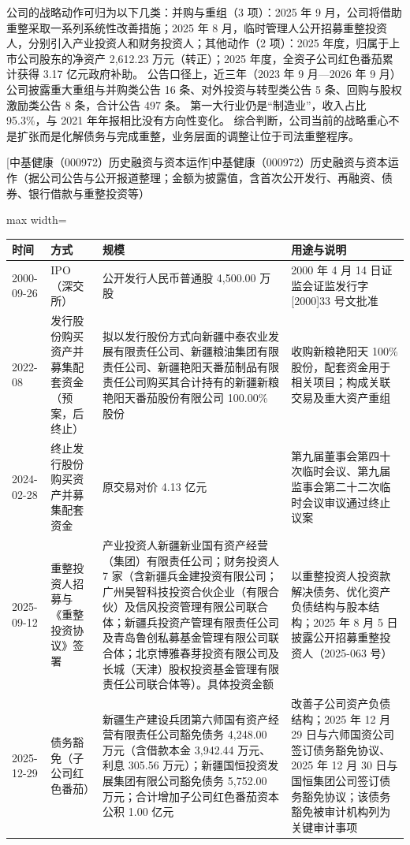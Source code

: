  公司的战略动作可归为以下几类：并购与重组（3 项）：2025 年 9 月，公司将借助重整采取一系列系统性改善措施；2025 年 8 月，临时管理人公开招募重整投资人，分别引入产业投资人和财务投资人；其他动作（2 项）：2025 年度，归属于上市公司股东的净资产 2,612.23 万元（转正）；2025 年度，全资子公司红色番茄累计获得 3.17 亿元政府补助。 公告口径上，近三年（2023 年 9 月---2026 年 9 月）公司披露重大重组与并购类公告 16 条、对外投资与转型类公告 5 条、回购与股权激励类公告 8 条，合计公告 497 条。 第一大行业仍是“制造业”，收入占比 95.3\%，与 2021 年年报相比没有方向性变化。 综合判断，公司当前的战略重心不是扩张而是化解债务与完成重整，业务层面的调整让位于司法重整程序。

\begin{center}\small\setlength{\tabcolsep}{4pt}
[中基健康（000972）历史融资与资本运作]{中基健康（000972）历史融资与资本运作（据公司公告与公开报道整理；金额为披露值，含首次公开发行、再融资、债券、银行借款与重整投资等）}
\begin{adjustbox}{max width=\textwidth}
\begin{tabular}{@{}p{1.45cm}p{2.55cm}p{4.05cm}p{4.95cm}@{}}
\toprule
时间 & 方式 & 规模 & 用途与说明 \\
\midrule
2000-09-26 & IPO（深交所） & 公开发行人民币普通股 4,\allowbreak{}500.00 万股 & 2000 年 4 月 14 日证监会证监发行字[2000]33 号文批准 \\
2022-08 & 发行股份购买资产并募集配套资金（预案，后终止） & 拟以发行股份方式向新疆中泰农业发展有限责任公司、\allowbreak{}新疆粮油集团有限责任公司、\allowbreak{}新疆艳阳天番茄制品有限责任公司购买其合计持有的新疆新粮艳阳天番茄股份有限公司 100.00\% 股份 & 收购新粮艳阳天 100\% 股份，\allowbreak{}配套资金用于相关项目；构成关联交易及重大资产重组 \\
2024-02-28 & 终止发行股份购买资产并募集配套资金 & 原交易对价 4.13 亿元 & 第九届董事会第四十次临时会议、\allowbreak{}第九届监事会第二十二次临时会议审议通过终止议案 \\
2025-09-12 & 重整投资人招募与《重整投资协议》签署 & 产业投资人新疆新业国有资产经营（集团）有限责任公司；财务投资人 7 家（含新疆兵金建投资有限公司；广州昊智科技投资合伙企业（有限合伙）及信风投资管理有限公司联合体；新疆兵投资产管理有限责任公司及青岛鲁创私募基金管理有限公司联合体；北京博雅春芽投资有限公司及长城（天津）股权投资基金管理有限责任公司联合体等）。具体投资金额 & 以重整投资人投资款解决债务、\allowbreak{}优化资产负债结构与股本结构；2025 年 8 月 5 日披露公开招募重整投资人（2025-063 号） \\
2025-12-29 & 债务豁免（子公司红色番茄） & 新疆生产建设兵团第六师国有资产经营有限责任公司豁免债务 4,\allowbreak{}248.00 万元（含借款本金 3,\allowbreak{}942.44 万元、\allowbreak{}利息 305.56 万元）；新疆国恒投资发展集团有限公司豁免债务 5,\allowbreak{}752.00 万元；合计增加子公司红色番茄资本公积 1.00 亿元 & 改善子公司资产负债结构；2025 年 12 月 29 日与六师国资公司签订债务豁免协议、\allowbreak{}2025 年 12 月 30 日与国恒集团公司签订债务豁免协议；该债务豁免被审计机构列为关键审计事项 \\
\bottomrule
\end{tabular}
\end{adjustbox}
\end{center}

